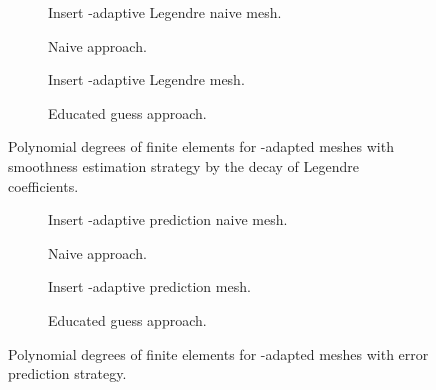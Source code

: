 \begin{figure}
\begin{subfigure}{.49\textwidth}
  \centering
  Insert \hp-adaptive Legendre naive mesh.
  \caption{Naive approach.}
\end{subfigure}
\begin{subfigure}{.49\textwidth}
  \centering
  Insert \hp-adaptive Legendre mesh.
  \caption{Educated guess approach.}
\end{subfigure}
\caption{Polynomial degrees of finite elements for \hp-adapted meshes with smoothness estimation strategy by the decay of Legendre coefficients.}
\label{fig:meshlegendre}
\end{figure}

\begin{figure}
\begin{subfigure}{.49\textwidth}
  \centering
  Insert \hp-adaptive prediction naive mesh.
  \caption{Naive approach.}
\end{subfigure}
\begin{subfigure}{.49\textwidth}
  \centering
  Insert \hp-adaptive prediction mesh.
  \caption{Educated guess approach.}
\end{subfigure}
\caption{Polynomial degrees of finite elements for \hp-adapted meshes with error prediction strategy.}
\label{fig:meshprediction}
\end{figure}